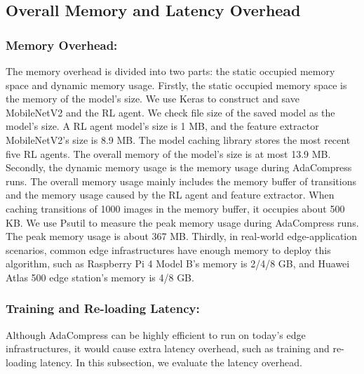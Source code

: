 \subsection{\textcolor{revise}{Overall Memory and Latency Overhead}}

\subsubsection{\textcolor{revise}{Memory Overhead:}}
\textcolor{revise}{The memory overhead is divided into two parts: the static occupied memory space and dynamic memory usage. Firstly, the static occupied memory space is the memory of the model's size. We use Keras to construct and save MobileNetV2 and the RL agent. We check file size of the saved model as the model's size. A RL agent model's size is 1 MB, and the feature extractor MobileNetV2's size is 8.9 MB. The model caching library stores the most recent five RL agents. The overall memory of the model's size is at most 13.9 MB. Secondly, the dynamic memory usage is the memory usage during AdaCompress runs. The overall memory usage mainly includes the memory buffer of transitions and the memory usage caused by the RL agent and feature extractor. When caching transitions of 1000 images in the memory buffer, it occupies about 500 KB. We use Psutil to measure the peak memory usage during AdaCompress runs. The peak memory usage is about 367 MB. Thirdly, in real-world edge-application scenarios, common edge infrastructures have enough memory to deploy this algorithm, such as Raspberry Pi 4 Model B's \cite{Raspberry-Pi} memory is 2/4/8 GB, and Huawei Atlas 500 edge station's memory is 4/8 GB.}

\subsubsection{\textcolor{revise}{Training and Re-loading Latency:}}
\textcolor{revise}{Although AdaCompress can be highly efficient to run on today's edge infrastructures, it would cause extra latency overhead, such as training and re-loading latency. In this subsection, we evaluate the latency overhead.}



